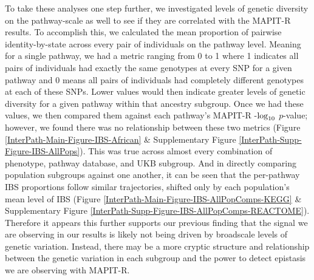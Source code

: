 \documentclass[12pt,a4paper]{article}
\def\log{{\rm log}}
\begin{document}

To take these analyses one step further, we investigated levels of genetic diversity on the pathway-scale as well to see if they are correlated with the MAPIT-R results. To accomplish this, we calculated the mean proportion of pairwise identity-by-state across every pair of individuals on the pathway level. Meaning for a single pathway, we had a metric ranging from 0 to 1 where 1 indicates all pairs of individuals had exactly the same genotypes at every SNP for a given pathway and 0 means all pairs of individuals had completely different genotypes at each of these SNPs. Lower values would then indicate greater levels of genetic diversity for a given pathway within that ancestry subgroup. Once we had these values, we then compared them against each pathway's MAPIT-R -$\log_{10}$ $p$-value; however, we found there was no relationship between these two metrics (Figure \ref{InterPath-Main-Figure-IBS-African} \& Supplementary Figure \ref{InterPath-Supp-Figure-IBS-AllPops}). This was true across almost every combination of phenotype, pathway database, and UKB subgroup. And in directly comparing population subgroups against one another, it can be seen that the per-pathway IBS proportions follow similar trajectories, shifted only by each population's mean level of IBS (Figure \ref{InterPath-Main-Figure-IBS-AllPopComps-KEGG} \& Supplementary Figure \ref{InterPath-Supp-Figure-IBS-AllPopComps-REACTOME}). Therefore it appears this further supports our previous finding that the signal we are observing in our results is likely not being driven by broadscale levels of genetic variation. Instead, there may be a more cryptic structure and relationship between the genetic variation in each subgroup and the power to detect epistasis we are observing with MAPIT-R.
\end{document}
